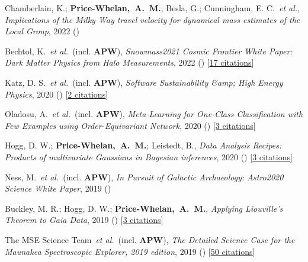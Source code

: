 \item[{\color{deemph}\scriptsize11}]Chamberlain, K.; \textbf{Price-Whelan,~A.~M.}; Besla, G.; Cunningham, E. C.~\textit{et al.}, \textit{Implications of the Milky Way travel velocity for dynamical mass estimates of the Local Group}, 2022 ()

\item[{\color{deemph}\scriptsize10}]Bechtol, K.~\textit{et al.}~(incl. \textbf{APW}), \textit{Snowmass2021 Cosmic Frontier White Paper: Dark Matter Physics from Halo Measurements}, 2022 () [\href{http://adsabs.harvard.edu/abs/2022arXiv220307354B}{17 citations}]

\item[{\color{deemph}\scriptsize9}]Katz, D. S.~\textit{et al.}~(incl. \textbf{APW}), \textit{Software Sustainability {\&}amp; High Energy Physics}, 2020 () [\href{http://adsabs.harvard.edu/abs/2020arXiv201005102K}{2 citations}]

\item[{\color{deemph}\scriptsize8}]Oladosu, A.~\textit{et al.}~(incl. \textbf{APW}), \textit{Meta-Learning for One-Class Classification with Few Examples using Order-Equivariant Network}, 2020 () [\href{http://adsabs.harvard.edu/abs/2020arXiv200704459O}{3 citations}]

\item[{\color{deemph}\scriptsize7}]Hogg, D. W.; \textbf{Price-Whelan,~A.~M.}; Leistedt, B., \textit{Data Analysis Recipes: Products of multivariate Gaussians in Bayesian inferences}, 2020 () [\href{http://adsabs.harvard.edu/abs/2020arXiv200514199H}{3 citations}]

\item[{\color{deemph}\scriptsize6}]Ness, M.~\textit{et al.}~(incl. \textbf{APW}), \textit{In Pursuit of Galactic Archaeology: Astro2020 Science White Paper}, 2019 ()

\item[{\color{deemph}\scriptsize5}]Buckley, M. R.; Hogg, D. W.; \textbf{Price-Whelan,~A.~M.}, \textit{Applying Liouville's Theorem to Gaia Data}, 2019 () [\href{http://adsabs.harvard.edu/abs/2019arXiv190700987B}{3 citations}]

\item[{\color{deemph}\scriptsize4}]The MSE Science Team~\textit{et al.}~(incl. \textbf{APW}), \textit{The Detailed Science Case for the Maunakea Spectroscopic Explorer, 2019 edition}, 2019 () [\href{http://adsabs.harvard.edu/abs/2019arXiv190404907T}{50 citations}]

